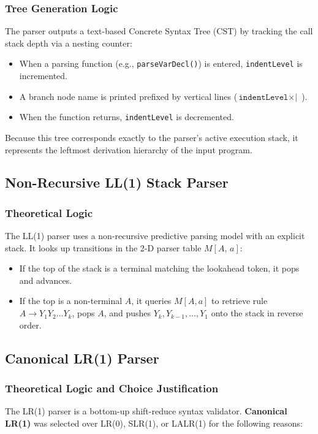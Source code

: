 \documentclass[11pt,a4paper]{article}
\begin{document}
\subsubsection{Tree Generation Logic}
The parser outputs a text-based Concrete Syntax Tree (CST) by tracking the call stack depth via a nesting counter:

\begin{itemize}
  \item When a parsing function (e.g., \texttt{parseVarDecl()}) is entered, \texttt{indentLevel} is incremented.
  \item A branch node name is printed prefixed by vertical lines ($\texttt{indentLevel} \times \texttt{|\ }$).
  \item When the function returns, \texttt{indentLevel} is decremented.
\end{itemize}

Because this tree corresponds exactly to the parser's active execution stack, it represents the leftmost derivation hierarchy of the input program.

\subsection{Non-Recursive LL(1) Stack Parser}

\subsubsection{Theoretical Logic}
The LL(1) parser uses a non-recursive predictive parsing model with an explicit stack. It looks up transitions in the 2-D parser table $M[A,\,a]$:

\begin{itemize}
  \item If the top of the stack is a terminal matching the lookahead token, it pops and advances.
  \item If the top is a non-terminal $A$, it queries $M[A, a]$ to retrieve rule $A \rightarrow Y_1 Y_2 \dots Y_k$, pops $A$, and pushes $Y_k, Y_{k-1}, \dots, Y_1$ onto the stack in reverse order.
\end{itemize}

\subsection{Canonical LR(1) Parser}

\subsubsection{Theoretical Logic and Choice Justification}
The LR(1) parser is a bottom-up shift-reduce syntax validator. \textbf{Canonical LR(1)} was selected over LR(0), SLR(1), or LALR(1) for the following reasons:
\end{document}
